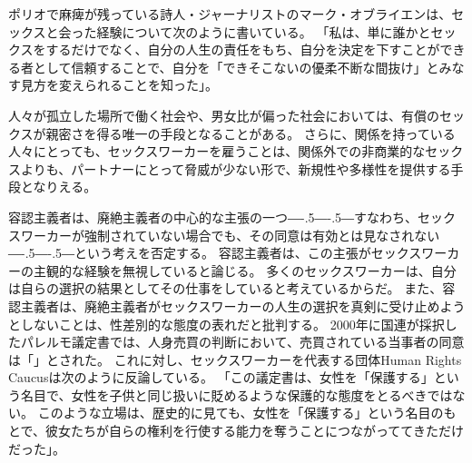 \documentclass[paper=a4,book,openany]{jlreq}
\def\DDASH{―\kern-.5\zw―\kern-.5\zw―} %
\begin{document}
ポリオで麻痺が残っている詩人・ジャーナリストのマーク・オブライエンは、セックスと会った経験について次のように書いている。
「私は、単に誰かとセックスをするだけでなく、自分の人生の責任をもち、自分を決定を下すことができる者として信頼することで、自分を「できそこないの優柔不断な間抜け」とみなす見方を変えられることを知った」\citep{obrien90:_seein_sex_surrog}。

人々が孤立した場所で働く社会や、男女比が偏った社会においては、有償のセックスが親密さを得る唯一の手段となることがある。
さらに、関係を持っている人々にとっても、セックスワーカーを雇うことは、関係外での非商業的なセックスよりも、パートナーにとって脅威が少ない形で、新規性や多様性を提供する手段となりえる\citep{mesko12:_effec_prost_stabil_roman_relat}。

容認主義者は、廃絶主義者の中心的な主張の一つ{\DDASH}すなわち、セックスワーカーが強制されていない場合でも、その同意は有効とは見なされない{\DDASH}という考えを否定する。
容認主義者は、この主張がセックスワーカーの主観的な経験を無視していると論じる。
多くのセックスワーカーは、自分は自らの選択の結果としてその仕事をしていると考えているからだ。
また、容認主義者は、廃絶主義者がセックスワーカーの人生の選択を真剣に受け止めようとしないことは、性差別的な態度の表れだと批判する。
2000年に国連が採択したパレルモ議定書では、人身売買の判断において、売買されている当事者の同意は「」とされた。
これに対し、セックスワーカーを代表する団体Human Rights Caucusは次のように反論している。
「この議定書は、女性を「保護する」という名目で、女性を子供と同じ扱いに貶めるような保護的な態度をとるべきではない。
このような立場は、歴史的に見ても、女性を「保護する」という名目のもとで、彼女たちが自らの権利を行使する能力を奪うことにつながっててきただけだった」\citep{caucus99:_recom_commen_draft_protoc_combat}。
\end{document}
